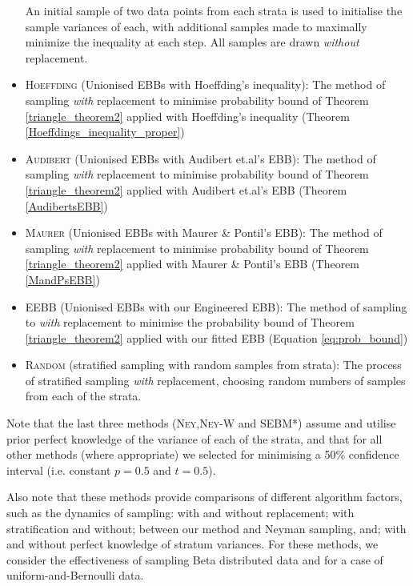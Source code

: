\begin{itemize}
An initial sample of two data points from each strata is used to initialise the sample variances of each, with additional samples made to maximally minimize the inequality at each step. All samples are drawn \textit{without} replacement.
\item \textsc{Hoeffding} (Unionised EBBs with Hoeffding's inequality): The method of sampling \textit{with} replacement to minimise probability bound of Theorem \ref{triangle_theorem2} applied with Hoeffding's inequality (Theorem \ref{Hoeffdings_inequality_proper})
\item \textsc{Audibert} (Unionised EBBs with Audibert et.al's EBB): The method of sampling \textit{with} replacement to minimise probability bound of Theorem \ref{triangle_theorem2} applied with Audibert et.al's EBB (Theorem \ref{AudibertsEBB})
\item \textsc{Maurer} (Unionised EBBs with Maurer \& Pontil's EBB): The method of sampling \textit{with} replacement to minimise probability bound of Theorem \ref{triangle_theorem2} applied with Maurer \& Pontil's EBB (Theorem \ref{MandPsEBB})
\item \textsc{EEBB} (Unionised EBBs with our Engineered EBB): The method of sampling to \textit{with} replacement to minimise the probability bound of Theorem \ref{triangle_theorem2} applied with our fitted EBB (Equation \ref{eq:prob_bound})
\item \textsc{Random} (stratified sampling with random samples from strata): The process of stratified sampling \textit{with} replacement, choosing random numbers of samples from each of the strata.
\end{itemize}
Note that the last three methods (\textsc{Ney},\textsc{Ney-W} and SEBM*) assume and utilise prior perfect knowledge of the variance of each of the strata, and that for all other methods (where appropriate) we selected for minimising a 50\% confidence interval (i.e. constant $p=0.5$ and $t=0.5$).

Also note that these methods provide comparisons of different algorithm factors, such as the dynamics of sampling: with and without replacement; with stratification and without; between our method and Neyman sampling, and; with and without perfect knowledge of stratum variances. 
For these methods, we consider the effectiveness of sampling Beta distributed data and for a case of uniform-and-Bernoulli data.

